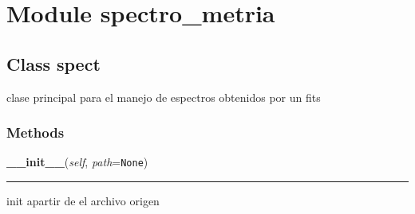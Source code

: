 %
%
%


\section{Module spectro\_metria}

    \label{spectro_metria}


\subsection{Class spect}

    \label{spectro_metria:spect}
clase principal para el manejo de espectros obtenidos por un fits



  \subsubsection{Methods}

    \label{spectro_metria:spect:__init__}

    \vspace{0.5ex}

\hspace{.8\funcindent}\begin{boxedminipage}{\funcwidth}

    \raggedright \textbf{\_\_init\_\_}(\textit{self}, \textit{path}={\tt None})

    \vspace{-1.5ex}

    \rule{\textwidth}{0.5\fboxrule}
\setlength{\parskip}{2ex}
    init apartir de el archivo origen

\setlength{\parskip}{1ex}
    \end{boxedminipage}

